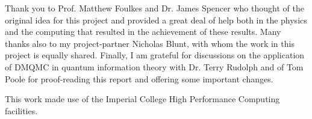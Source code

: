 

\begin{acknowledgements}      %

Thank you to Prof. Matthew Foulkes and Dr. James Spencer who thought of the original idea for this project and provided a great deal of help both in the physics and the computing that resulted in the achievement of these results. Many thanks also to my project-partner Nicholas Blunt, with whom the work in this project is equally shared. Finally, I am grateful for discussions on the application of DMQMC in quantum information theory with Dr. Terry Rudolph and of Tom Poole for proof-reading this report and offering some important changes.

This work made use of the Imperial College High Performance Computing facilities.


\end{acknowledgements}


